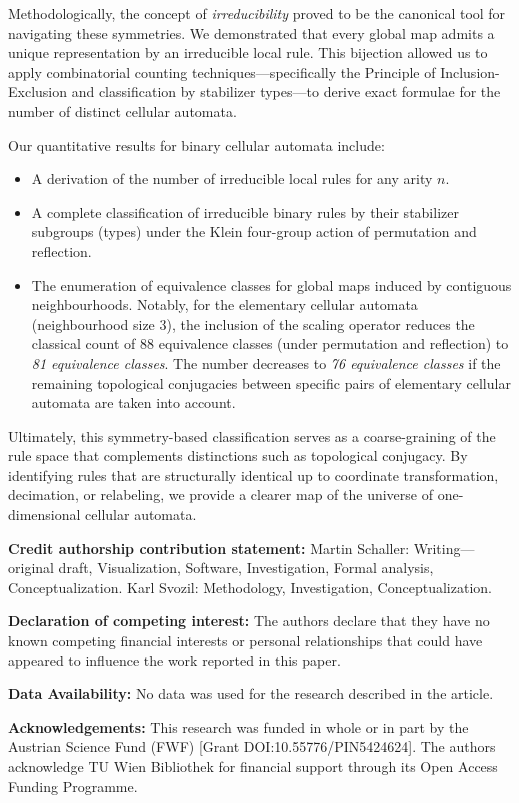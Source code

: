 \documentclass[a4paper]{article}
\begin{document}
Methodologically, the concept of \textit{irreducibility} proved to be the canonical tool for navigating these symmetries. We demonstrated that every global map admits a unique representation by an irreducible local rule. This bijection allowed us to apply combinatorial counting techniques---specifically the Principle of Inclusion-Exclusion and classification by stabilizer types---to derive exact formulae for the number of distinct cellular automata.

Our quantitative results for binary cellular automata include:
\begin{itemize}
    \item A derivation of the number of irreducible local rules for any arity $n$.
    \item A complete classification of irreducible binary rules by their stabilizer subgroups (types) under the Klein four-group action of permutation and reflection.
    \item The enumeration of equivalence classes for global maps induced by contiguous neighbourhoods.
Notably, for the elementary cellular automata (neighbourhood size 3), the inclusion of the scaling operator reduces the classical count of 88 equivalence classes (under permutation and reflection) to \textit{81 equivalence classes}.
The number decreases to \textit{76 equivalence classes} if the remaining topological conjugacies
between specific pairs of elementary cellular automata are taken into account.
\end{itemize}

Ultimately, this symmetry-based classification serves as a coarse-graining of the rule space that complements
distinctions such as topological conjugacy.
By identifying rules that are structurally identical up to coordinate transformation, decimation, or relabeling,
we provide a clearer map of the universe of one-dimensional cellular automata.

\textbf{Credit authorship contribution statement:}
Martin Schaller: Writing---original draft, Visualization, Software, Investigation, Formal analysis, Conceptualization. Karl Svozil: Methodology, Investigation, Conceptualization.

\textbf{Declaration of competing interest:}
The authors declare that they have no known competing financial interests or personal relationships that could have appeared to influence the work reported in this paper.

\textbf{Data Availability:} No data was used for the research described in the article.

\textbf{Acknowledgements:}
This research was funded in whole or in part by the Austrian Science Fund (FWF) [Grant DOI:10.55776/PIN5424624]. The authors acknowledge TU Wien Bibliothek for financial support through its Open Access Funding Programme.




\end{document}
